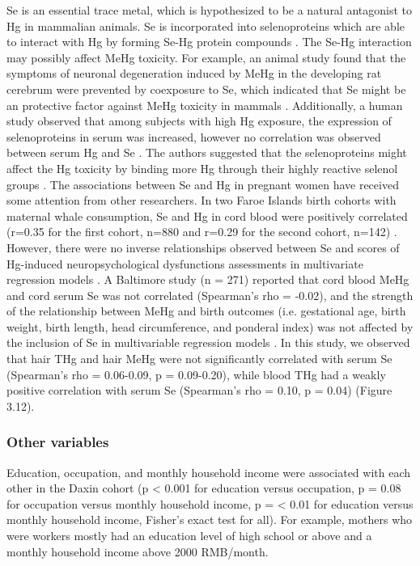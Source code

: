 Se is an essential trace metal, which is hypothesized to be a natural antagonist to Hg in mammalian animals. Se is incorporated into selenoproteins which are able to interact with Hg by forming Se-Hg protein compounds \citep{gromer2005human,taylor2009recent}. The Se-Hg interaction may possibly affect MeHg toxicity. For example, an animal study found that the symptoms of neuronal degeneration induced by MeHg in the developing rat cerebrum were prevented by coexposure to Se, which indicated that Se might be an protective factor against MeHg toxicity in mammals \citep{sakamoto2013selenomethionine}. Additionally, a human study observed that among subjects with high Hg exposure, the expression of selenoproteins in serum was increased, however no correlation was observed between serum Hg and Se \citep{chen2006roles}. The authors suggested that the selenoproteins might affect the Hg toxicity by binding more Hg through their highly reactive selenol groups \citep{chen2006roles}. The associations between Se and Hg in pregnant women have received some attention from other researchers. In two Faroe Islands birth cohorts with maternal whale consumption, Se and Hg in cord blood were positively correlated (r=0.35 for the first cohort, n=880 and r=0.29 for the second cohort, n=142) \citep{choi2008selenium}. However, there were no inverse relationships observed between Se and scores of Hg-induced neuropsychological dysfunctions assessments in multivariate regression models \citep{choi2008selenium}. A Baltimore study (n = 271) reported that cord blood MeHg and cord serum Se was not correlated (Spearman's rho = -0.02), and the strength of the relationship between MeHg and birth outcomes (i.e. gestational age, birth weight, birth length, head circumference, and ponderal index) was not affected by the inclusion of Se in multivariable regression models \citep{wells2016cord}. In this study, we observed that hair THg and hair MeHg were not significantly correlated with serum Se (Spearman's rho = 0.06-0.09, p = 0.09-0.20), while blood THg had a weakly positive correlation with serum Se (Spearman's rho = 0.10, p = 0.04) (Figure 3.12).

\subsubsection{Other variables}

Education, occupation, and monthly household income were associated with each other in the Daxin cohort (p < 0.001 for education versus occupation, p = 0.08 for occupation versus monthly household income, p = < 0.01 for education versus monthly household income, Fisher's exact test for all). For example, mothers who were workers mostly had an education level of high school or above and a monthly household income
above 2000 RMB/month.

